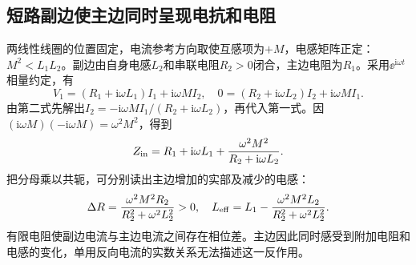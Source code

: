 \subsection{短路副边使主边同时呈现电抗和电阻}
两线性线圈的位置固定，电流参考方向取使互感项为$+M$，电感矩阵正定：$M^2<L_1L_2$。副边由自身电感$L_2$和串联电阻$R_2>0$闭合，主边电阻为$R_1$。采用$\ee^{\mathrm i\omega t}$相量约定，有
\[
 V_1=(R_1+\mathrm i\omega L_1)I_1+\mathrm i\omega MI_2,
 \quad
 0=(R_2+\mathrm i\omega L_2)I_2+\mathrm i\omega MI_1.
\]
由第二式先解出$I_2=-\mathrm i\omega MI_1/(R_2+\mathrm i\omega L_2)$，再代入第一式。因$(\mathrm i\omega M)(-\mathrm i\omega M)=\omega^2M^2$，得到
\[
 Z_{\rm in}=R_1+\mathrm i\omega L_1+
 \frac{\omega^2M^2}{R_2+\mathrm i\omega L_2}.
\]
把分母乘以共轭，可分别读出主边增加的实部及减少的电感：
\[
 \Delta R=\frac{\omega^2M^2R_2}{R_2^2+\omega^2L_2^2}>0,\quad
 L_{\rm eff}=L_1-\frac{\omega^2M^2L_2}{R_2^2+\omega^2L_2^2}.
\]
有限电阻使副边电流与主边电流之间存在相位差。主边因此同时感受到附加电阻和电感的变化，单用反向电流的实数关系无法描述这一反作用。

